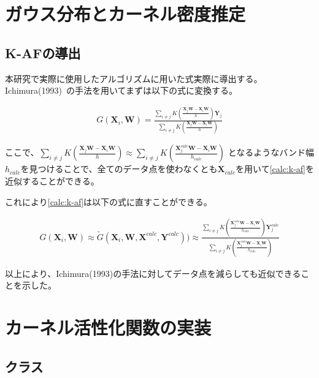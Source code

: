 \appendix
\chapter{ガウス分布とカーネル密度推定}


\section{K-AFの導出}
\label{appendix:calc}

本研究で実際に使用したアルゴリズムに用いた式実際に導出する。
Ichimura(1993)~\cite{ichimura}の手法を用いてまずは以下の式に変換する。


\begin{eqnarray}
G(\mathbf{X}_i, \mathbf{W})=\frac{\sum_{i\neq j} K\left(\frac{\mathbf{X}_j \mathbf{W} - \mathbf{X}_i \mathbf{W}}{h}\right)\mathbf{Y}_j}{\sum_{i\neq j} K\left(\frac{\mathbf{X}_j \mathbf{W} - \mathbf{X}_i \mathbf{W}}{h}\right)}
\label{calc:k-af}
\end{eqnarray}

ここで、$ \sum_{i\neq j} K\left(\frac{\mathbf{X}_j \mathbf{W} - \mathbf{X}_i \mathbf{W}}{h}\right) \approx	\sum_{i\neq j} K\left(\frac{\mathbf{X}^{calc}_j \mathbf{W} - \mathbf{X}_i \mathbf{W}}{h_{calc}}\right)$
となるようなバンド幅$ h_{calc} $を見つけることで、全てのデータ点を使わなくとも$ \mathbf{X}_{calc} $を用いて\ref{calc:k-af}を近似することができる。

これにより\ref{calc:k-af}は以下の式に直すことができる。

\begin{eqnarray}
G(\mathbf{X}_i, \mathbf{W}) \approx \tilde{G}(\mathbf{X}_i, \mathbf{W}, \mathbf{X}^{calc}, \mathbf{Y}^{calc})) \approx \frac{\sum_{i\neq j} K\left(\frac{\mathbf{X}^{calc}_j \mathbf{W} - \mathbf{X}_i \mathbf{W}}{h_{calc}}\right)\mathbf{Y}^{calc}_j}{\sum_{i\neq j} K\left(\frac{\mathbf{X}^{calc}_j \mathbf{W} - \mathbf{X}_i \mathbf{W}}{h_{calc}}\right)}
\label{calc:k-af-2}
\end{eqnarray}

以上により、Ichimura(1993)の手法に対してデータ点を減らしても近似できることを示した。


\chapter{カーネル活性化関数の実装}
\label{appendix:algorithm}


\section{クラス}


